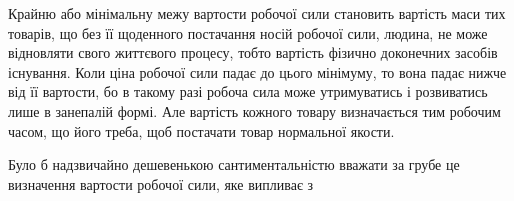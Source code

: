 Крайню або мінімальну межу вартости робочої сили становить
вартість маси тих товарів, що без її щоденного постачання носій
робочої сили, людина, не може відновляти свого життєвого
процесу, тобто вартість фізично доконечних засобів існування.
Коли ціна робочої сили падає до цього мінімуму, то вона падає
нижче від її вартости, бо в такому разі робоча сила може утримуватись
і розвиватись лише в занепалій формі. Але вартість кожного
товару визначається тим робочим часом, що його треба,
щоб постачати товар нормальної якости.

Було б надзвичайно дешевенькою сантиментальністю вважати
за грубе це визначення вартости робочої сили, яке випливає з
\parbreak{}  %
